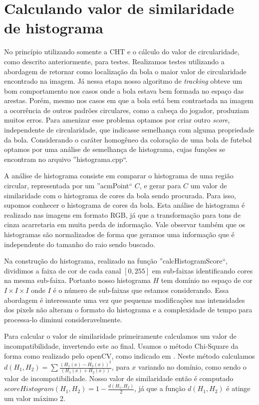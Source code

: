 \documentclass[11pt,a4paper]{article}
\begin{document}
\section{Calculando valor de similaridade de histograma}

 No princípio utilizando somente a CHT e o cálculo do valor de circularidade, como descrito anteriormente, para testes. Realizamos testes utilizando a abordagem de retornar como localização da bola o maior valor de circularidade encontrado na imagem. Já nessa etapa nosso algoritmo de \textit{tracking} obteve um bom comportamento nos casos onde a bola estava bem formada no espaço das arestas. Porém, mesmo nos casos em que a bola está bem contrastada na imagem a ocorrência de outros padrões circulares, como a cabeça do jogador, produziam muitos erros. Para amenizar esse problema optamos por criar outro \textit{score}, independente de circularidade, que indicasse semelhança com alguma propriedade da bola. Considerando o caráter homogêneo da coloração de uma bola de futebol optamos por uma análise de semelhança de histograma, cujas funções se encontram no arquivo ''histograma.cpp``.

 A análise de histograma consiste em comparar o histograma de uma região circular, representada por um ''acmPoint`` $C$, e gerar para $C$ um valor de similaridade com o histograma de cores da bola sendo procurada. Para isso, supomos conhecer o histograma de cores da bola. Esta análise de histograma é realizado nas imagens em formato RGB, já que a transformação para tons de cinza acarretaria em muita perda de informação. Vale observar também que os histogramas são normalizados de forma que geramos uma informação que é independente do tamanho do raio sendo buscado.

 Na construção do histograma, realizado na função ''calcHistogramScore``, dividimos a faixa de cor de cada canal $[0,255]$ em sub-faixas identificando cores na mesma sub-faixa. Portanto nosso histograma $H$ tem domínio no espaço de cor $I\times I\times I$ onde $I$ é o número de sub-faixas que estamos considerando. Essa abordagem é interessante uma vez que pequenas modificações nas intensidades dos pixels não alteram o formato do histograma e a complexidade de tempo para processa-lo diminui consideravelmente.

 Para calcular o valor de similaridade primeiramente calculamos um valor de incompatibilidade, invertendo este ao final. Usamos o método Chi-Square da forma como realizado pelo openCV, como indicado em \cite{OCVManual}. Neste método calculamos $d(H_1,H_2) = \sum{\frac{(H_1(x) - H_2(x))^2}{(H_1(x) + H_2(x))} }$, para $x$ variando no domínio, como sendo o valor de incompatibilidade. Nosso valor de similaridade então é computado $scoreHistogram(H_1,H_2) = 1 - \frac{d(H_1,H_2)}{2}$, já que a função $d(H_1,H_2)$ é atinge um valor máximo 2.
\end{document}
